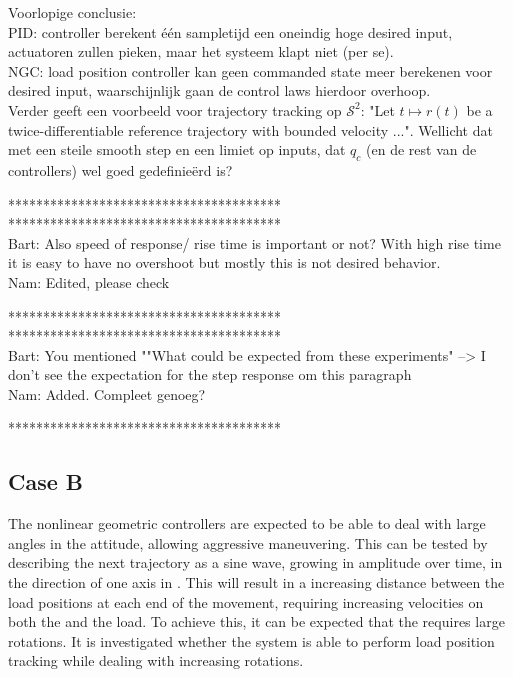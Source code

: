 Voorlopige conclusie: \\
PID: controller berekent één sampletijd een oneindig hoge desired input, actuatoren zullen pieken, maar het systeem klapt niet (per se). \\
NGC: load position controller kan geen commanded state meer berekenen voor desired input, waarschijnlijk gaan de control laws hierdoor overhoop. \\
Verder \cite{Bullo2005} geeft een voorbeeld voor trajectory tracking op $ \mathcal{S}^2 $: "Let $ t\mapsto r(t) $ be a twice-differentiable reference trajectory with bounded velocity ...". Wellicht dat met een steile smooth step en een limiet op inputs, dat $ q_c $ (en de rest van de controllers) wel goed gedefinieërd is?

***************************************\\

***************************************\\
Bart: Also speed of response/ rise time is important or not? With high rise time it is easy to have no overshoot but mostly this is not desired behavior.\\
Nam: Edited, please check

***************************************\\

***************************************\\
Bart: You mentioned ""What could be expected from these experiments" --> I don't see the expectation for the step response om this paragraph\\
Nam: Added. Compleet genoeg?

***************************************\\
\subsection*{Case B}



The nonlinear geometric controllers are expected to be able to deal with large angles in the  attitude, allowing aggressive maneuvering.
This can be tested by describing the next trajectory as a sine wave, growing in amplitude over time, in the direction of one axis in \IF.
This will result in a increasing distance between the load positions at each end of the movement, requiring increasing velocities on both the  and the load.
To achieve this, it can be expected that the  requires large rotations. It is investigated whether the system is able to perform load position tracking while dealing with increasing  rotations.

